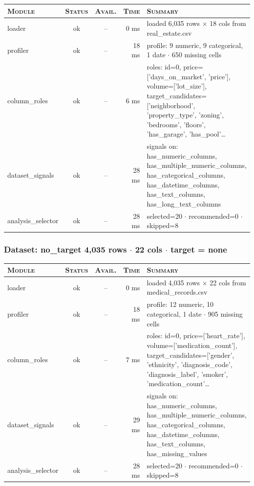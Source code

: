 \documentclass[11pt,a4paper]{article}
\begin{document}
\begin{tabularx}{\linewidth}{l c c r X}
\toprule
\textsc{Module} & \textsc{Status} & \textsc{Avail.} & \textsc{Time} & \textsc{Summary} \\
\midrule
loader & \textcolor{ok}{ok} & -- & 0 ms & loaded 6,035 rows $\times$ 18 cols from real\_estate.csv \\
profiler & \textcolor{ok}{ok} & -- & 18 ms & profile: 9 numeric, 9 categorical, 1 date $\cdot$ 650 missing cells \\
column\_roles & \textcolor{ok}{ok} & -- & 6 ms & roles: id=0, price=['days\_on\_market', 'price'], volume=['lot\_size'], target\_candidates=['neighborhood', 'property\_type', 'zoning', 'bedrooms', 'floors', 'has\_garage', 'has\_pool'\ldots{} \\
dataset\_signals & \textcolor{ok}{ok} & -- & 28 ms & signals on: has\_numeric\_columns, has\_multiple\_numeric\_columns, has\_categorical\_columns, has\_datetime\_columns, has\_text\_columns, has\_long\_text\_columns \\
analysis\_selector & \textcolor{ok}{ok} & -- & 28 ms & selected=20 $\cdot$ recommended=0 $\cdot$ skipped=8 \\
\bottomrule
\end{tabularx}


\subsubsection*{Dataset: no\_target
\hfill {\color{ink3}\footnotesize 4,035 rows
{$\boldsymbol{\cdot}$} 22 cols
{$\boldsymbol{\cdot}$} target = none}}

\begin{tabularx}{\linewidth}{l c c r X}
\toprule
\textsc{Module} & \textsc{Status} & \textsc{Avail.} & \textsc{Time} & \textsc{Summary} \\
\midrule
loader & \textcolor{ok}{ok} & -- & 0 ms & loaded 4,035 rows $\times$ 22 cols from medical\_records.csv \\
profiler & \textcolor{ok}{ok} & -- & 18 ms & profile: 12 numeric, 10 categorical, 1 date $\cdot$ 905 missing cells \\
column\_roles & \textcolor{ok}{ok} & -- & 7 ms & roles: id=0, price=['heart\_rate'], volume=['medication\_count'], target\_candidates=['gender', 'ethnicity', 'diagnosis\_code', 'diagnosis\_label', 'smoker', 'medication\_count'\ldots{} \\
dataset\_signals & \textcolor{ok}{ok} & -- & 29 ms & signals on: has\_numeric\_columns, has\_multiple\_numeric\_columns, has\_categorical\_columns, has\_datetime\_columns, has\_text\_columns, has\_missing\_values \\
analysis\_selector & \textcolor{ok}{ok} & -- & 28 ms & selected=20 $\cdot$ recommended=0 $\cdot$ skipped=8 \\
\bottomrule
\end{tabularx}
\end{document}
